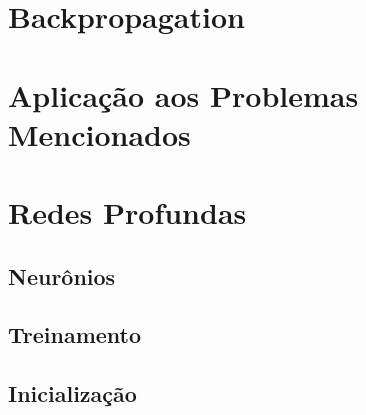 \section{Backpropagation}
\label{sec:ann_backpropagation}



\section{Aplicação aos Problemas Mencionados}
\label{sec:ann_application_mentioned_problem}



\section{Redes Profundas}
\label{sec:ann_deep_networks}



\subsection{Neurônios}
\label{subsec:ann_neurons}



\subsection{Treinamento}
\label{subsec:ann_training}



\subsection{Inicialização}
\label{subsec:ann_inicialization}
